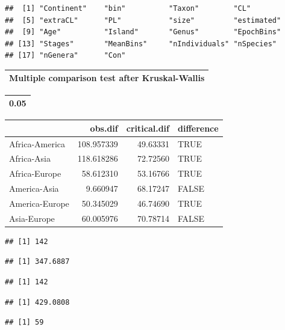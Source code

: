\documentclass[]{article}
\begin{document}
\begin{verbatim}
##  [1] "Continent"    "bin"          "Taxon"        "CL"          
##  [5] "extraCL"      "PL"           "size"         "estimated"   
##  [9] "Age"          "Island"       "Genus"        "EpochBins"   
## [13] "Stages"       "MeanBins"     "nIndividuals" "nSpecies"    
## [17] "nGenera"      "Con"
\end{verbatim}

\begin{table}

\centering
\begin{tabular}[t]{l}
\hline
Multiple comparison test after Kruskal-Wallis\\
\hline
\end{tabular}
\centering
\begin{tabular}[t]{r}
\hline
0.05\\
\hline
\end{tabular}
\centering
\begin{tabular}[t]{l|r|r|l}
\hline
  & obs.dif & critical.dif & difference\\
\hline
Africa-America & 108.957339 & 49.63331 & TRUE\\
\hline
Africa-Asia & 118.618286 & 72.72560 & TRUE\\
\hline
Africa-Europe & 58.612310 & 53.16766 & TRUE\\
\hline
America-Asia & 9.660947 & 68.17247 & FALSE\\
\hline
America-Europe & 50.345029 & 46.74690 & TRUE\\
\hline
Asia-Europe & 60.005976 & 70.78714 & FALSE\\
\hline
\end{tabular}
\end{table}

\begin{verbatim}
## [1] 142
\end{verbatim}

\begin{verbatim}
## [1] 347.6887
\end{verbatim}

\begin{verbatim}
## [1] 142
\end{verbatim}

\begin{verbatim}
## [1] 429.0808
\end{verbatim}

\begin{verbatim}
## [1] 59
\end{verbatim}
\end{document}
